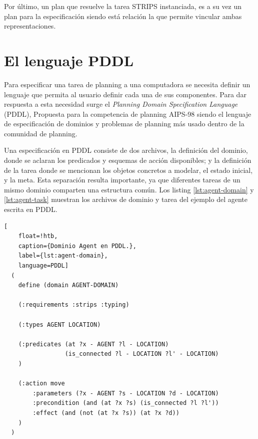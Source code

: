 Por último, un plan que resuelve la tarea STRIPS instanciada, es a su vez un
plan para la especificación siendo está relación la que permite vincular ambas
representaciones.

\section{El lenguaje PDDL}

Para especificar una tarea de planning a una computadora se necesita definir un
lenguaje que permita al usuario definir cada una de sus componentes. Para dar
respuesta a esta necesidad surge el \emph{Planning Domain Specification
Language} (PDDL), Propuesta para la competencia de planning AIPS-98
\citep{McDermott1998} siendo el lenguaje de especificación de dominios y
problemas de planning más usado dentro de la comunidad de planning.

Una especificación en PDDL consiste de dos archivos, la definición del dominio,
donde se aclaran los predicados y esquemas de acción disponibles; y la
definición de la tarea donde se mencionan los objetos concretos a modelar, el
estado inicial, y la meta. Esta separación resulta importante, ya que diferentes
tareas de un mismo dominio comparten una estructura común. Los listing
\ref{lst:agent-domain} y \ref{lst:agent-task} muestran los archivos de dominio y
tarea del ejemplo del agente escrita en PDDL.

\begin{lstlisting}[
    float=!htb,
    caption={Dominio Agent en PDDL.},
    label={lst:agent-domain},
    language=PDDL]
  (
    define (domain AGENT-DOMAIN)

    (:requirements :strips :typing)

    (:types AGENT LOCATION)

    (:predicates (at ?x - AGENT ?l - LOCATION)
                 (is_connected ?l - LOCATION ?l' - LOCATION)
    )

    (:action move
        :parameters (?x - AGENT ?s - LOCATION ?d - LOCATION)
        :precondition (and (at ?x ?s) (is_connected ?l ?l'))
        :effect (and (not (at ?x ?s)) (at ?x ?d))
    )
  )
\end{lstlisting}

